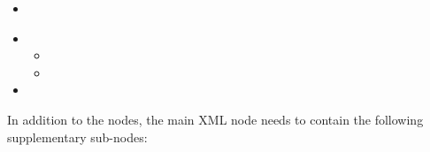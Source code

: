 %
\attrIntro

\begin{itemize}
  \itemsep0em
  \item \nameDescription
\end{itemize}


\begin{itemize}
  \item \variableDescription
    \variableChildrenIntro
    \begin{itemize}
      \item \distributionDescription
    \item \functionDescription
    \end{itemize}
    \item \constantVariablesDescription
\end{itemize}

In addition to the  nodes, the main XML node
 needs to contain the following supplementary sub-nodes:

